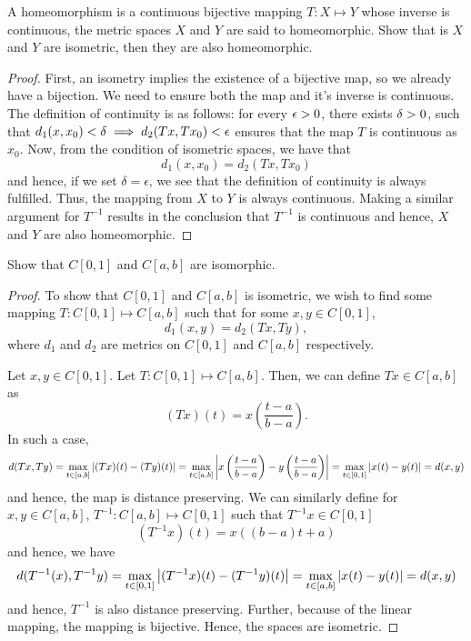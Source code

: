 \begin{question}
    A homeomorphism is a continuous bijective mapping $T : X \mapsto Y$ whose inverse is continuous, the metric spaces $X$ and $Y$ are said to homeomorphic. Show that is $X$ and $Y$ are isometric, then they are also homeomorphic.
\label{section1.6-5}
\end{question}
\begin{proof}
    First, an isometry implies the existence of a bijective map, so we already have a bijection. We need to ensure both the map and it's inverse is continuous. The definition of continuity is as follows: for every $\epsilon > 0$, there exists $\delta > 0$, such that $d_1(x , x_0) < \delta \implies d_2(Tx , Tx_0) < \epsilon$ ensures that the map $T$ is continuous as $x_0$. Now, from the condition of isometric spaces, we have that
    \[d_1(x , x_0) = d_2(Tx ,Tx_0)\]
    and hence, if we set $\delta = \epsilon$, we see that the definition of continuity is always fulfilled. Thus, the mapping from $X$ to $Y$ is always continuous. Making a similar argument for $T^{-1}$ results in the conclusion that $T^{-1}$ is continuous and hence, $X$ and $Y$ are also homeomorphic.
\end{proof}

\begin{question}
    Show that $C[0,1]$ and $C[a,b]$ are isomorphic.
    \label{section1.6-6}
\end{question}
\begin{proof}
    To show that $C[0,1]$ and $C[a,b]$ is isometric, we wish to find some mapping $T : C[0,1] \mapsto C[a,b]$ such that for some $x , y \in C[0,1]$, 
    \[d_1(x,y) = d_2(Tx , Ty),\]
    where $d_1$ and $d_2$ are metrics on $C[0,1]$ and $C[a,b]$ respectively.
    
    Let $x , y \in C[0,1]$. Let $T : C[0,1] \mapsto C[a,b]$. Then, we can define $Tx \in C[a,b]$ as
    \[(Tx) (t) = x\left( \frac{t-a}{b-a}\right).\]
    In such a case,
    \[d(Tx , Ty)  = \max_{t \in [a,b]} \left\lvert (Tx)(t) - (Ty)(t) \right\rvert = \max_{t \in [a,b]} \left\lvert x\left( \frac{t-a}{b-a}\right) - y\left( \frac{t-a}{b-a}\right) \right\rvert = \max_{t \in [0,1]} \left\lvert x(t) - y(t) \right\rvert = d(x,y)\]
    and hence, the map is distance preserving. We can similarly define for $x , y \in C[a,b]$, $T^{-1} : C[a,b] \mapsto C[0,1]$ such that $T^{-1}x \in C[0,1]$
    \[(T^{-1}x)(t) = x((b-a)t + a)\]
     and hence, we have
     \[d(T^{-1}(x) , T^{-1}y) = \max_{t \in [0,1]} \left\lvert (T^{-1}x)(t) - (T^{-1}y)(t) \right\rvert  = \max_{t \in [a,b]} \left\lvert x(t) - y(t) \right\rvert = d(x,y)\]
      and hence, $T^{-1}$ is also distance preserving. Further, because of the linear mapping, the mapping is bijective. Hence, the spaces are isometric.
\end{proof}


